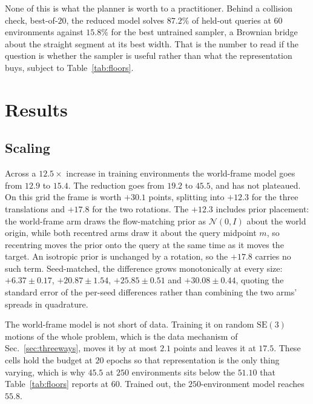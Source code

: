 \documentclass[conference]{IEEEtran}
\newcommand{\SE}{\mathrm{SE}(3)}
\begin{document}
None of this is what the planner is worth to a practitioner. Behind a collision
check, best-of-$20$, the reduced model solves $87.2\%$ of held-out queries at $60$
environments against $15.8\%$ for the best untrained sampler, a Brownian bridge about the
straight segment at its best width. That is the number to
read if the question is whether the sampler is useful rather than what the
representation buys, subject to Table~\ref{tab:floors}.

\section{Results}
\label{sec:results}
\subsection{Scaling}
\label{sec:scaling}
Across a $12.5\times$ increase in training environments the world-frame model
goes from $12.9$ to $15.4$. The reduction goes from $19.2$ to $45.5$, and has
not plateaued. On this grid the frame is worth $+30.1$ points, splitting into
$+12.3$ for the three translations and $+17.8$ for the two rotations. The
$+12.3$ includes prior placement: the world-frame arm draws the flow-matching
prior as $\mathcal{N}(0, I)$ about the world origin, while both recentred arms
draw it about the query midpoint $m$, so recentring moves the prior onto the
query at the same time as it moves the target. An isotropic prior is unchanged
by a rotation, so the $+17.8$ carries no such term. Seed-matched, the difference grows
monotonically at every size: $+6.37 \pm 0.17$, $+20.87 \pm 1.54$,
$+25.85 \pm 0.51$ and $+30.08 \pm 0.44$, quoting the standard error of the
per-seed differences rather than combining the two arms' spreads in quadrature.

The world-frame model is not short of data. Training it on random $\SE$ motions
of the whole problem, which is the data mechanism of Sec.~\ref{sec:threeways},
moves it by at most $2.1$ points and leaves it at $17.5$. These cells hold the
budget at $20$ epochs so that representation is the only thing varying, which is
why $45.5$ at $250$ environments sits below the $51.10$ that
Table~\ref{tab:floors} reports at $60$. Trained out, the $250$-environment
model reaches $55.8$.
\end{document}
